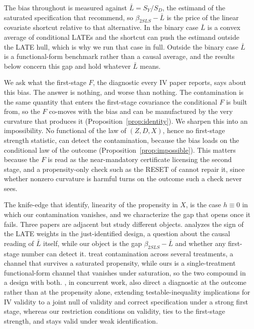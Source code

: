\documentclass[preprint,11pt,authoryear]{elsarticle}
\theoremstyle{definition}
\begin{document}
The bias throughout is measured against $\bar L=S_Y/S_D$, the estimand of the saturated
specification that \citet{blandhol2022} recommend, so $\beta_{2SLS}-\bar L$ is the price of
the linear covariate shortcut relative to that alternative. In the binary case $\bar L$ is a
convex average of conditional LATEs and the shortcut can push the estimand outside the LATE
hull, which is why we run that case in full. Outside the binary case $\bar L$ is a
functional-form benchmark rather than a causal average, and the results below concern this
gap and hold whatever $\bar L$ means.

We ask what the first-stage $F$, the diagnostic every IV paper reports, says about this
bias. The answer is nothing, and worse than nothing. The contamination is the same quantity
that enters the first-stage covariance the conditional $F$ is built from, so the $F$
co-moves with the bias and can be manufactured by the very curvature that produces it
(Proposition~\ref{prop:identity}). We sharpen this into an impossibility. No functional of
the law of $(Z,D,X)$, hence no first-stage strength statistic, can detect the contamination,
because the bias loads on the conditional law of the outcome
(Proposition~\ref{prop:impossible}). This matters because the $F$ is read as the
near-mandatory certificate licensing the second stage, and a propensity-only check such as
the RESET of \citet{blandhol2022} cannot repair it, since whether nonzero curvature is
harmful turns on the outcome such a check never sees.

The knife-edge that \citet{blandhol2022} identify, linearity of the propensity in $X$, is
the case $h\equiv0$ in which our contamination vanishes, and we characterize the gap that
opens once it fails. Three papers are adjacent but study different objects.
\citet{sloczynski2022} analyzes the sign of the LATE weights in the just-identified design,
a question about the causal reading of $\bar L$ itself, while our object is the gap
$\beta_{2SLS}-\bar L$ and whether any first-stage number can detect it. \citet{goldsmith2024}
treat contamination across several treatments, a channel that survives a saturated
propensity, while ours is a single-treatment functional-form channel that vanishes under
saturation, so the two compound in a design with both. \citet{krumme2026}, in concurrent
work, also direct a diagnostic at the outcome rather than at the propensity alone, extending
testable-inequality implications for IV validity to a joint null of validity and correct
specification under a strong first stage, whereas our restriction conditions on validity,
ties to the first-stage strength, and stays valid under weak identification.
\end{document}
